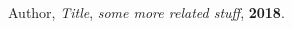 \begin{thebibliography}{999}

     Author, \textit{Title}, \textit{some more related stuff}, \textbf{2018}.
   
\end{thebibliography}